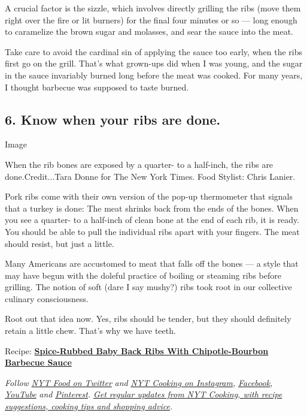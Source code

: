 A crucial factor is the sizzle, which involves directly grilling the
ribs (move them right over the fire or lit burners) for the final four
minutes or so --- long enough to caramelize the brown sugar and
molasses, and sear the sauce into the meat.

Take care to avoid the cardinal sin of applying the sauce too early,
when the ribs first go on the grill. That's what grown-ups did when I
was young, and the sugar in the sauce invariably burned long before the
meat was cooked. For many years, I thought barbecue was supposed to
taste burned.

\hypertarget{6-know-when-your-ribs-are-done}{%
\subsection{6. Know when your ribs are
done.}\label{6-know-when-your-ribs-are-done}}

Image

When the rib bones are exposed by a quarter- to a half-inch, the ribs
are done.Credit...Tara Donne for The New York Times. Food Stylist: Chris
Lanier.

Pork ribs come with their own version of the pop-up thermometer that
signals that a turkey is done: The meat shrinks back from the ends of
the bones. When you see a quarter- to a half-inch of clean bone at the
end of each rib, it is ready. You should be able to pull the individual
ribs apart with your fingers. The meat should resist, but just a little.

Many Americans are accustomed to meat that falls off the bones --- a
style that may have begun with the doleful practice of boiling or
steaming ribs before grilling. The notion of soft (dare I say mushy?)
ribs took root in our collective culinary consciousness.

Root out that idea now. Yes, ribs should be tender, but they should
definitely retain a little chew. That's why we have teeth.

Recipe:
\textbf{\href{https://cooking.nytimes.com/recipes/1021242-spice-rubbed-baby-back-ribs-with-chipotle-bourbon-barbecue-sauce}{Spice-Rubbed
Baby Back Ribs With Chipotle-Bourbon Barbecue Sauce}}

\emph{Follow} \href{https://twitter.com/nytfood}{\emph{NYT Food on
Twitter}} \emph{and}
\href{https://www.instagram.com/nytcooking/}{\emph{NYT Cooking on
Instagram}}\emph{,}
\href{https://www.facebook.com/nytcooking/}{\emph{Facebook}}\emph{,}
\href{https://www.youtube.com/nytcooking}{\emph{YouTube}} \emph{and}
\href{https://www.pinterest.com/nytcooking/}{\emph{Pinterest}}\emph{.}
\href{https://www.nytimes.com/newsletters/cooking}{\emph{Get regular
updates from NYT Cooking, with recipe suggestions, cooking tips and
shopping advice}}\emph{.}

